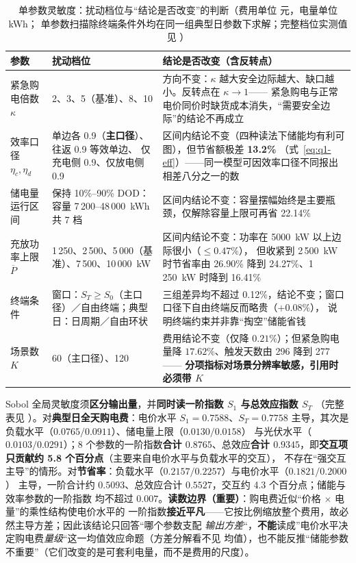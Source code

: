 \begin{table}[htbp]
  \centering
  \caption{单参数灵敏度：扰动档位与“结论是否改变”的判断（费用单位 元，电量单位 kWh；
           单参数扫描除终端条件外均在同一组典型日参数下求解；完整档位实测值见
           ）}
  \label{tab:sens}
  \small
  \setlength{\tabcolsep}{4pt}
  \begin{tabularx}{\linewidth}{L{2.05cm} L{3.15cm} Y}
    \toprule
    参数 & 扰动档位 & 结论是否改变（含反转点） \\
    \midrule
    紧急购电倍数 \(\kappa\) & 2、3、5（基准）、8、10
      & 方向不变：\(\kappa\) 越大安全边际越大、缺口越小。反转点在 \(\kappa\to1\)——
        紧急购电与正常电价同价时缺货成本消失，“需要安全边际”的结论不再成立 \\
    效率口径 \(\eta_c,\eta_d\) & 单边各 0.9（\textbf{主口径}）、往返 0.9 等效单边、
        仅充电侧 0.9、仅放电侧 0.9
      & 区间内结论不变（四种读法下储能均有利可图），但节省额极差 \textbf{13.2\%}
        （式~\eqref{eq:q1-eff}）——同一模型可因效率口径不同报出相差八分之一的数 \\
    储电量运行区间 & 保持 10\%--90\% DOD：容量 7\,200--48\,000~kWh 共 7 档
      & 区间内结论不变：容量摆幅始终是主要瓶颈，仅解除容量上限可再省 22.14\% \\
    充放功率上限 \(\overline P\) & 1\,250、2\,500、5\,000（基准）、7\,500、10\,000~kW
      & 区间内结论不变：功率在 5000~kW 以上边际很小（\(\le0.47\%\)），
        但收紧到 2\,500~kW 时节省率由 26.90\% 降到 24.27\%、1\,250~kW 时降到 16.41\% \\
    终端条件  & 窗口：\(S_T\ge S_0\)（主口径）／自由终端；典型日：日周期／自由环状
      & 三组差异均不超过 0.12\%，结论不变；窗口口径下自由终端反而略贵（\(+0.08\%\)），
        说明终端约束并非靠“掏空”储能省钱 \\
    场景数 \(K\) & 60（主口径）、120
      & 费用结论不变（仅降 \(0.21\%\)）；但紧急购电量降 \(17.62\%\)、触发天数由 296 降到 277——
        \textbf{分项指标对场景分辨率敏感，引用时必须带 \(K\)} \\
    \bottomrule
  \end{tabularx}
\end{table}

Sobol 全局灵敏度须\textbf{区分输出量}，并\textbf{同时读一阶指数 \(S_1\) 与总效应指数 \(S_T\)}
（完整表见 ）。对\textbf{典型日全天购电费}：电价水平
\(S_1=0.7588\)、\(S_T=0.7758\) 主导，其次是负载水平（\(0.0765/0.0911\)）、储电量上限（\(0.0130/0.0158\)）
与光伏水平（\(0.0103/0.0291\)）；8 个参数的一阶指数\textbf{合计 \(0.8765\)}、总效应\textbf{合计
\(0.9345\)}，即\textbf{交互项只贡献约 5.8 个百分点}（主要来自电价水平与负载水平的交互），
不存在“强交互主导”的情形。对\textbf{节省率}：负载水平（\(0.2157/0.2257\)）与电价水平（\(0.1821/0.2000\)）
主导，一阶合计约 \(0.5093\)、总效应合计 \(0.5527\)，交互约 4.3 个百分点；储能与效率参数的一阶指数
均不超过 \(0.007\)。\textbf{读数边界（重要）}：购电费近似“价格 \(\times\) 电量”的乘性结构使电价水平的
一阶指数\textbf{接近平凡}——它按比例缩放整个费用，故必然主导方差；因此该结论只回答“哪个参数支配
\emph{输出方差}“，\textbf{不能}读成”电价水平决定购电费\emph{量级}“这一均值效应命题（方差分解看不见
均值），也不能反推“储能参数不重要”（它们改变的是可套利电量，而不是费用的尺度）。

